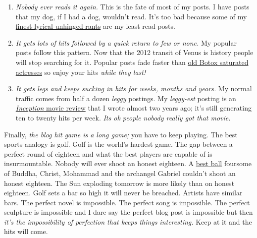 \begin{enumerate}
\item
  \emph{Nobody ever reads it again.} This is the fate of most of my
  posts. I have posts that my dog, if I had a dog, wouldn't read. It's
  too bad because some of my
  \href{http://bakerjd99.wordpress.com/2010/06/16/i-did-not-have-sex-with-that-oil-spill/}{finest
  lyrical unhinged rants} are my least read posts.
\item
  \emph{It gets lots of hits followed by a quick return to few or none.}
  My popular posts follow this pattern. Now that the 2012 transit of
  Venus is history people will stop searching for it. Popular posts fade
  faster than
  \href{http://www.drparkave.com/news/10-famous-women-aging-gracefully-10-who-arent/}{old
  Botox saturated actresses} so enjoy your hits \emph{while they last!}
\item
  \emph{It gets legs and keeps sucking in hits for weeks, months and
  years.} My normal traffic comes from half a dozen \emph{leggy}
  postings. My \emph{leggy-est} posting is an
  \href{http://bakerjd99.wordpress.com/2010/07/28/the-20-seconds-that-ruined-inception/}{\emph{Inception}
  movie review} that I wrote almost two years ago; it's still generating
  ten to twenty hits per week. \emph{Its ok people nobody really got that
  movie.}
\end{enumerate}
Finally, \emph{the blog hit game is a long game;} you have to keep
playing. The best sports analogy is golf. Golf is the world's hardest
game. The gap between a perfect round of eighteen and what the best
players are capable of is insurmountable. Nobody will ever shoot an
honest eighteen. A
\href{http://golf.about.com/cs/golfterms/g/bldef\_bestball.htm}{best
ball} foursome of Buddha, Christ, Mohammad and the archangel Gabriel
couldn't shoot an honest eighteen. The Sun exploding tomorrow is more
likely than on honest eighteen. Golf sets a bar so high it will never be
breached. Artists have similar bars. The perfect novel is impossible.
The perfect song is impossible. The perfect sculpture is impossible and
I dare say the perfect blog post is impossible but then \emph{it's the
impossibility of perfection that keeps things interesting.} Keep at it
and the hits will come.



%